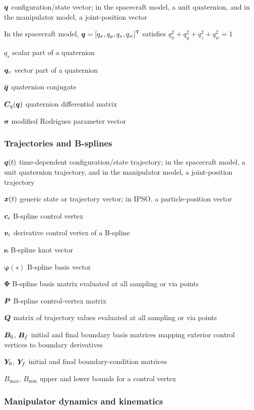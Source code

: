 $\bm{q}$ configuration/state vector; in the spacecraft model, a unit quaternion, and in the manipulator model, a joint-position vector

In the spacecraft model, $\bm{q} = [q_x, q_y, q_z, q_w]^{\mathsf{T}}$ satisfies
$q_x^2 + q_y^2 + q_z^2 + q_w^2 = 1$

$q_s$ scalar part of a quaternion

$\bm{q}_v$ vector part of a quaternion

$\overline{\bm{q}}$ quaternion conjugate

$\bm{C}_q(\bm{q})$ quaternion differential matrix

$\boldsymbol{\sigma}$ modified Rodrigues parameter vector

\subsubsection*{Trajectories and B-splines}

$\bm{q}(t)$ time-dependent configuration/state trajectory; in the spacecraft model, a unit quaternion trajectory, and in the manipulator model, a joint-position trajectory

$\bm{x}(t)$ generic state or trajectory vector; in IPSO, a particle-position vector

$\bm{c}_i$ B-spline control vertex

$\bm{v}_i$ derivative control vertex of a B-spline

$\boldsymbol{\kappa}$ B-spline knot vector

$\boldsymbol{\varphi}(s)$ B-spline basis vector

$\boldsymbol{\Phi}$ B-spline basis matrix evaluated at all sampling or via points

$\bm{P}$ B-spline control-vertex matrix

$\bm{Q}$ matrix of trajectory values evaluated at all sampling or via points

$\bm{B}_0$, $\bm{B}_f$ initial and final boundary basis matrices mapping exterior control vertices to boundary derivatives

$\bm{Y}_0$, $\bm{Y}_f$ initial and final boundary-condition matrices

$B_{\max}$, $B_{\min}$ upper and lower bounds for a control vertex

\subsubsection*{Manipulator dynamics and kinematics}

